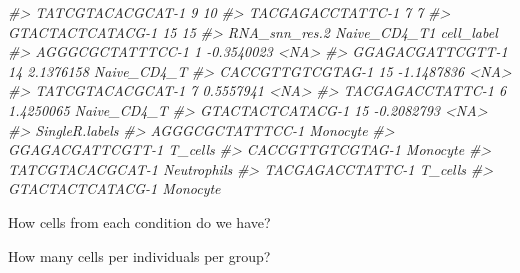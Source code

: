 \documentclass[
]{book}
\newenvironment{Shaded}{\begin{snugshade}}{\end{snugshade}}
\newcommand{\CommentTok}[1]{\textcolor[rgb]{0.56,0.35,0.01}{\textit{#1}}}
\newcommand{\FunctionTok}[1]{\textcolor[rgb]{0.13,0.29,0.53}{\textbf{#1}}}
\newcommand{\NormalTok}[1]{#1}
\newcommand{\SpecialCharTok}[1]{\textcolor[rgb]{0.81,0.36,0.00}{\textbf{#1}}}
\begin{document}
\begin{Shaded}
\begin{Highlighting}[]
\CommentTok{\#\textgreater{} TATCGTACACGCAT{-}1               9              10}
\CommentTok{\#\textgreater{} TACGAGACCTATTC{-}1               7               7}
\CommentTok{\#\textgreater{} GTACTACTCATACG{-}1              15              15}
\CommentTok{\#\textgreater{}                  RNA\_snn\_res.2 Naive\_CD4\_T1  cell\_label}
\CommentTok{\#\textgreater{} AGGGCGCTATTTCC{-}1             1   {-}0.3540023        \textless{}NA\textgreater{}}
\CommentTok{\#\textgreater{} GGAGACGATTCGTT{-}1            14    2.1376158 Naive\_CD4\_T}
\CommentTok{\#\textgreater{} CACCGTTGTCGTAG{-}1            15   {-}1.1487836        \textless{}NA\textgreater{}}
\CommentTok{\#\textgreater{} TATCGTACACGCAT{-}1             7    0.5557941        \textless{}NA\textgreater{}}
\CommentTok{\#\textgreater{} TACGAGACCTATTC{-}1             6    1.4250065 Naive\_CD4\_T}
\CommentTok{\#\textgreater{} GTACTACTCATACG{-}1            15   {-}0.2082793        \textless{}NA\textgreater{}}
\CommentTok{\#\textgreater{}                  SingleR.labels}
\CommentTok{\#\textgreater{} AGGGCGCTATTTCC{-}1       Monocyte}
\CommentTok{\#\textgreater{} GGAGACGATTCGTT{-}1        T\_cells}
\CommentTok{\#\textgreater{} CACCGTTGTCGTAG{-}1       Monocyte}
\CommentTok{\#\textgreater{} TATCGTACACGCAT{-}1    Neutrophils}
\CommentTok{\#\textgreater{} TACGAGACCTATTC{-}1        T\_cells}
\CommentTok{\#\textgreater{} GTACTACTCATACG{-}1       Monocyte}
\end{Highlighting}
\end{Shaded}

How cells from each condition do we have?

\begin{Shaded}
\end{Shaded}

How many cells per individuals per group?

\begin{Shaded}
\end{Shaded}
\end{document}
